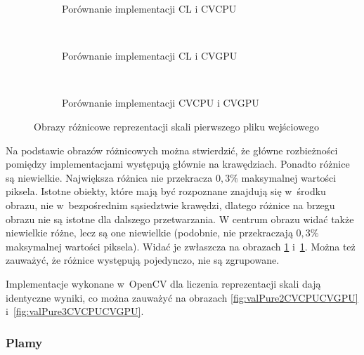 \begin{figure}
\begin{subfigure}[b]{0.3\textwidth}
	\centering
	\setlength\fboxsep{0pt}
	\setlength\fboxrule{0.5pt}
	\caption{Porównanie implementacji CL i CVCPU}
	\label{fig:valPure3CLCVCPU}
\end{subfigure}
~
\begin{subfigure}[b]{0.3\textwidth}
	\centering
	\setlength\fboxsep{0pt}
	\setlength\fboxrule{0.5pt}
	\caption{Porównanie implementacji CL i CVGPU}
	\label{fig:valPure3CLCVGPU}
\end{subfigure}
~
\begin{subfigure}[b]{0.3\textwidth}
	\centering
	\setlength\fboxsep{0pt}
	\setlength\fboxrule{0.5pt}
	\caption{Porównanie implementacji CVCPU i CVGPU}
	\label{fig:valPure3CVCPUCVCPU}                 
\end{subfigure}
\caption{Obrazy różnicowe reprezentacji skali pierwszego pliku wejściowego}
\label{lena_scales}
\label{fig:valPure3}
\end{figure}

Na podstawie obrazów różnicowych można stwierdzić, że główne rozbieżności pomiędzy implementacjami występują głównie na krawędziach. Ponadto różnice są niewielkie. Największa różnica nie przekracza $ 0,3\% $ maksymalnej wartości piksela. Istotne obiekty, które mają być rozpoznane znajdują się w~środku obrazu, nie w~bezpośrednim sąsiedztwie krawędzi, dlatego różnice na brzegu obrazu nie są istotne dla dalszego przetwarzania. W centrum obrazu widać także niewielkie różne, lecz są one niewielkie (podobnie, nie przekraczają $ 0,3\% $ maksymalnej wartości piksela). Widać je zwłaszcza na obrazach \ref{fig:valPure3CLCVCPU} i~\ref{fig:valPure3CLCVCPU}. Można też zauważyć, że różnice występują pojedynczo, nie są zgrupowane.

Implementacje wykonane w~OpenCV dla liczenia reprezentacji skali dają identyczne wyniki, co można zauważyć na obrazach \ref{fig:valPure2CVCPUCVGPU} i~\ref{fig:valPure3CVCPUCVGPU}.

\subsubsection{Plamy}
\label{subsubsec:plamyRysunki}



